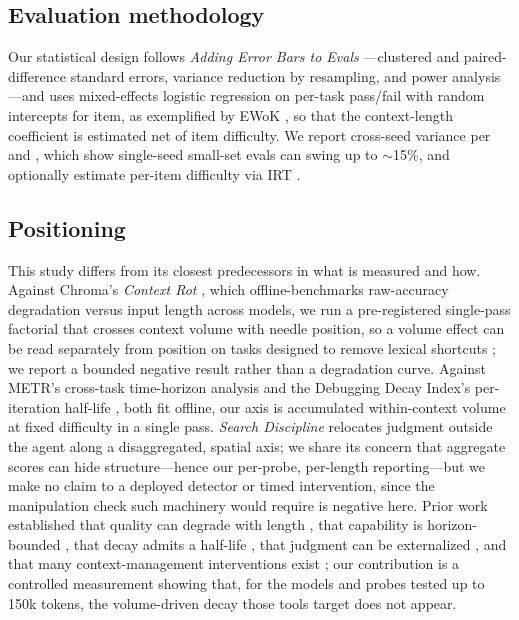 \documentclass[11pt]{article}
\begin{document}
\subsection{Evaluation methodology}
\label{sec:rw-methodology}

Our statistical design follows \emph{Adding Error Bars to Evals}
\cite{miller2024errorbars}---clustered and paired-difference standard errors,
variance reduction by resampling, and power analysis---and uses mixed-effects
logistic regression on per-task pass/fail with random intercepts for item, as
exemplified by EWoK \cite{ivanova2024ewok}, so that the context-length
coefficient is estimated net of item difficulty. We report cross-seed variance
per \cite{madaan2024variance} and \cite{hochlehnert2025soberlook}, which show
single-seed small-set evals can swing up to $\sim$15\%, and optionally estimate
per-item difficulty via IRT \cite{maiapolo2024tinybenchmarks}.

\subsection{Positioning}
\label{sec:rw-positioning}

This study differs from its closest predecessors in what is measured and how. Against Chroma's \emph{Context Rot} \cite{hong2025contextrot}, which offline-benchmarks raw-accuracy degradation versus input length across models, we run a pre-registered single-pass factorial that crosses context volume with needle position, so a volume effect can be read separately from position \cite{liu2024lostmiddle} on tasks designed to remove lexical shortcuts \cite{modarressi2025nolima}; we report a bounded negative result rather than a degradation curve. Against METR's cross-task time-horizon analysis \cite{kwa2025metr} and the Debugging Decay Index's per-iteration half-life \cite{adnan2025ddi}, both fit offline, our axis is accumulated within-context volume at fixed difficulty in a single pass. \emph{Search Discipline} \cite{srinivasan2026searchdiscipline} relocates judgment outside the agent along a disaggregated, spatial axis; we share its concern that aggregate scores can hide structure---hence our per-probe, per-length reporting---but we make no claim to a deployed detector or timed intervention, since the manipulation check such machinery would require is negative here. Prior work established that quality can degrade with length \cite{hong2025contextrot,liu2024lostmiddle}, that capability is horizon-bounded \cite{kwa2025metr}, that decay admits a half-life \cite{adnan2025ddi}, that judgment can be externalized \cite{srinivasan2026searchdiscipline}, and that many context-management interventions exist \cite{packer2023memgpt,wang2023recursive,jiang2023llmlingua,lewis2020rag,chopra2026headroom}; our contribution is a controlled measurement showing that, for the models and probes tested up to 150k tokens, the volume-driven decay those tools target does not appear.
\end{document}
